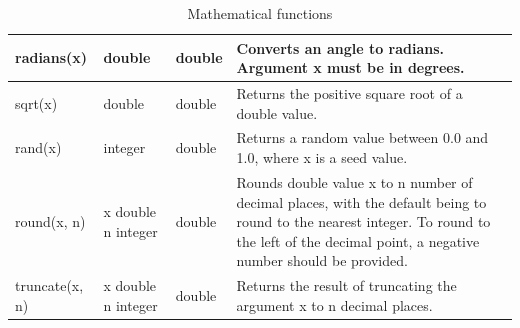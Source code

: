 \documentclass[11pt,a4paper]{ivoa}
\begin{document}
\begin{table}[thm]
\begin{tabular}{|p{}|p{}|p{}|p{}|}
        \hline
        radians(x) &
        double &
        double &
        Converts an angle to radians. Argument x must be in degrees.
        \tabularnewline

        \hline
        sqrt(x) &
        double &
        double &
        Returns the positive square root of a double value.
        \tabularnewline

        \hline
        rand(x) &
        integer &
        double &
        Returns a random value between 0.0 and 1.0, where x is a seed  value.
        \tabularnewline

        \hline
        round(x, n) &
        x double \newline n integer &
        double &
        Rounds double value x to n number of decimal places, with the default being to round to the nearest integer.
        To round to the left of the decimal point, a negative number should be provided.
        \tabularnewline

        \hline
        truncate(x, n) &
        x double \newline n integer &
        double &
        Returns the result of truncating the argument x to n decimal places.
        \tabularnewline

        \hline
    \end{tabular}
    \caption{Mathematical functions}
    \label{table:math.functions}
\end{table}
\end{document}
